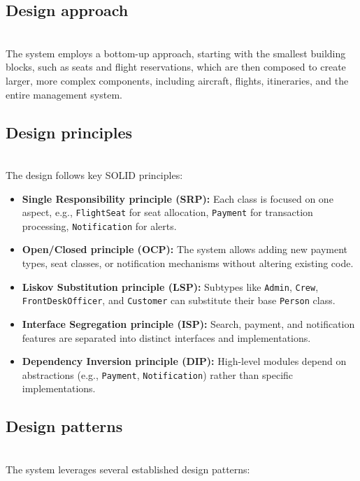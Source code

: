 \subsection{Design approach}\label{-tHpAIDT6Ch1Ya3M-KEEe}
\\
The system employs a bottom-up approach, starting with the smallest building blocks, such as seats and flight reservations, which are then composed to create larger, more complex components, including aircraft, flights, itineraries, and the entire management system.

\subsection{Design principles}\label{CP5ikBc2Tx4BtKbJkbz7g}
\\
The design follows key SOLID principles:

\begin{itemize}
\item
\protect{}\label{lHsQj2vVwaBIajVbm0Gt5}
\textbf{Single Responsibility principle (SRP):} Each class is focused on one aspect, e.g., \texttt{FlightSeat} for seat allocation, \texttt{Payment} for transaction processing, \texttt{Notification} for alerts.
\item
\protect{}\label{fbejhDJ4qkCfFC0EA0l-2}
\textbf{Open/Closed principle (OCP):} The system allows adding new payment types, seat classes, or notification mechanisms without altering existing code.
\item
\protect{}\label{3WClwEXdqSiyIjweTqanu}
\textbf{Liskov Substitution principle (LSP):} Subtypes like \texttt{Admin}, \texttt{Crew}, \texttt{FrontDeskOfficer}, and \texttt{Customer} can substitute their base \texttt{Person} class.
\item
\protect{}\label{wiPddJwO8ZGe7-XBOqaWt}
\textbf{Interface Segregation principle (ISP):} Search, payment, and notification features are separated into distinct interfaces and implementations.
\item
\protect{}\label{znhO2TSzsJcU0IVd5qoTu}
\textbf{Dependency Inversion principle (DIP):} High-level modules depend on abstractions (e.g., \texttt{Payment}, \texttt{Notification}) rather than specific implementations.
\end{itemize}

\subsection{Design patterns}\label{KWFaHQgjLmzx2_Cbe3fVS}
\\
The system leverages several established design patterns:

